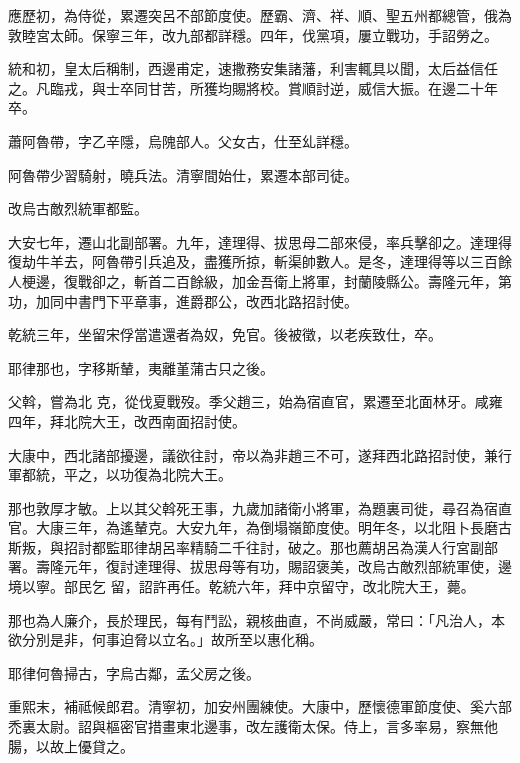 \begin{pinyinscope}
 應歷初，為侍從，累遷突呂不部節度使。歷霸、濟、祥、順、聖五州都總管，俄為敦睦宮太師。保寧三年，改九部都詳穩。四年，伐黨項，屢立戰功，手詔勞之。



 統和初，皇太后稱制，西邊甫定，速撒務安集諸藩，利害輒具以聞，太后益信任之。凡臨戎，與士卒同甘苦，所獲均賜將校。賞順討逆，威信大振。在邊二十年卒。



 蕭阿魯帶，字乙辛隱，烏隗部人。父女古，仕至乣詳穩。



 阿魯帶少習騎射，曉兵法。清寧間始仕，累遷本部司徒。



 改烏古敵烈統軍都監。



 大安七年，遷山北副部署。九年，達理得、拔思母二部來侵，率兵擊卻之。達理得復劫牛羊去，阿魯帶引兵追及，盡獲所掠，斬渠帥數人。是冬，達理得等以三百餘人梗邊，復戰卻之，斬首二百餘級，加金吾衛上將軍，封蘭陵縣公。壽隆元年，第功，加同中書門下平章事，進爵郡公，改西北路招討使。



 乾統三年，坐留宋俘當遣還者為奴，免官。後被徵，以老疾致仕，卒。



 耶律那也，字移斯輦，夷離堇蒲古只之後。



 父斡，嘗為北
 克，從伐夏戰歿。季父趙三，始為宿直官，累遷至北面林牙。咸雍四年，拜北院大王，改西南面招討使。



 大康中，西北諸部擾邊，議欲往討，帝以為非趙三不可，遂拜西北路招討使，兼行軍都統，平之，以功復為北院大王。



 那也敦厚才敏。上以其父斡死王事，九歲加諸衛小將軍，為題裏司徙，尋召為宿直官。大康三年，為遙輦克。大安九年，為倒塌嶺節度使。明年冬，以北阻卜長磨古斯叛，與招討都監耶律胡呂率精騎二千往討，破之。那也薦胡呂為漢人行宮副部署。壽隆元年，復討達理得、拔思母等有功，賜詔褒美，改烏古敵烈部統軍使，邊境以寧。部民乞
 留，詔許再任。乾統六年，拜中京留守，改北院大王，薨。



 那也為人廉介，長於理民，每有鬥訟，親核曲直，不尚威嚴，常曰：「凡治人，本欲分別是非，何事迫脅以立名。」故所至以惠化稱。



 耶律何魯掃古，字烏古鄰，孟父房之後。



 重熙末，補祗候郎君。清寧初，加安州團練使。大康中，歷懷德軍節度使、奚六部禿裏太尉。詔與樞密官措畫東北邊事，改左護衛太保。侍上，言多率易，察無他腸，以故上優貸之。




\end{pinyinscope}
